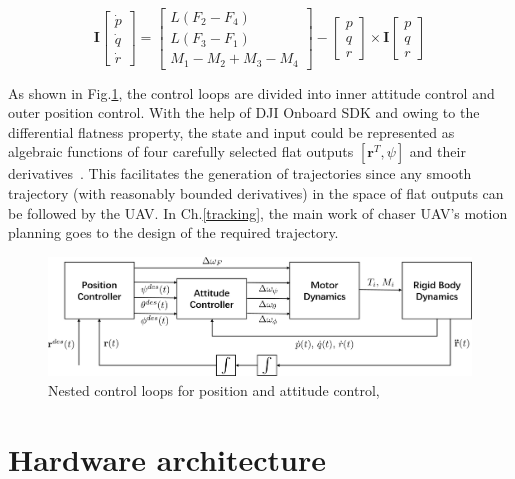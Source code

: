 \begin{equation}\label{eq:euler}
\mathbf{I}\begin{bmatrix}\dot{p}\\\dot{q}\\\dot{r}\end{bmatrix}=\begin{bmatrix}L(F_2-F_4)\\L(F_3-F_1)\\M_1-M_2+M_3-M_4\end{bmatrix}-\begin{bmatrix}p\\q\\r\end{bmatrix}\times
\mathbf{I}\begin{bmatrix}p\\q\\r\end{bmatrix}
\end{equation}

As shown in Fig.\ref{fig:nest}, the control loops are divided into inner attitude control and outer position control. With the help of DJI Onboard SDK and owing to the differential flatness property, the state and input could be represented as algebraic functions of four carefully selected flat outputs $[\mathbf{r}^T, \psi]$ and their derivatives~\cite{Snap}. This facilitates the generation of trajectories since any smooth trajectory (with reasonably bounded derivatives) in the space of flat outputs can be followed by the UAV. In Ch.\ref{tracking}, the main work of chaser UAV's motion planning goes to the design of the required trajectory.

\begin{figure}[htb]
  \centering
  \includegraphics[width=1.0\textwidth]{figure/chapter_2/nest.png}
  \caption{Nested control loops for position and attitude control,~\cite{GRASP}}
  \label{fig:nest}
\end{figure}

\section{Hardware architecture}\label{hardware}

